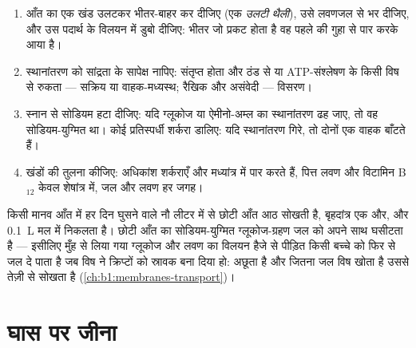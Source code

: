 \begin{method}[किसी अवशोषण प्रयोग को पढ़ना]\label{met:b1:digestion-absorption:everted}
\begin{enumerate}
  \item आँत का एक खंड उलटकर भीतर-बाहर कर दीजिए (एक \emph{उलटी थैली}),
        उसे लवणजल से भर दीजिए, और उस पदार्थ के विलयन में डुबो दीजिए:
        भीतर जो प्रकट होता है वह पहले की गुहा से  पार करके आया
        है।
  \item स्थानांतरण को सांद्रता के सापेक्ष नापिए: संतृप्त होता और ठंड से
        या ATP-संश्लेषण के किसी विष से रुकता --- सक्रिय या
        वाहक-मध्यस्थ; रैखिक और असंवेदी --- विसरण।
  \item स्नान से सोडियम हटा दीजिए: यदि ग्लूकोज या ऐमीनो-अम्ल का
        स्थानांतरण ढह जाए, तो वह सोडियम-युग्मित था। कोई प्रतिस्पर्धी
        शर्करा डालिए: यदि स्थानांतरण गिरे, तो दोनों एक वाहक बाँटते हैं।
  \item खंडों की तुलना कीजिए: अधिकांश शर्कराएँ और  मध्यांत्र
        में पार करते हैं, पित्त लवण और विटामिन B$_{12}$ केवल शेषांत्र
        में, जल और लवण हर जगह।
\end{enumerate}
\end{method}

\begin{example}[जल का बजट]\label{ex:b1:digestion-absorption:water}
किसी मानव आँत में हर दिन घुसने वाले नौ लीटर में से छोटी आँत आठ सोखती है,
बृहदांत्र एक और, और \qty{0.1}{L} मल में निकलता है। छोटी आँत का
सोडियम-युग्मित ग्लूकोज-ग्रहण जल को अपने साथ घसीटता है --- इसीलिए मुँह से
लिया गया ग्लूकोज और लवण का विलयन हैजे से पीड़ित किसी बच्चे को फिर से जल
दे पाता है जब विष ने क्रिप्टों को स्रावक बना दिया हो:  अछूता है और
जितना जल विष खोता है उससे तेज़ी से सोखता है
(\cref{ch:b1:membranes-transport})।
\end{example}

\section{घास पर जीना}

